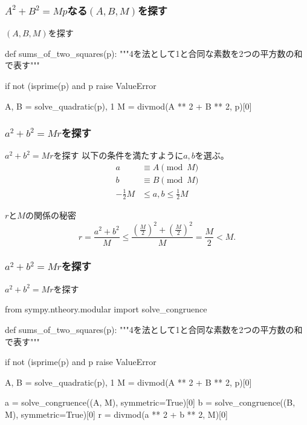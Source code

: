 \documentclass[dvipdfmx,11pt,notheorems]{beamer}
\theoremstyle{definition}
\begin{document}
\begin{frame}[fragile]\frametitle{$A^{2}+B^{2} = Mp$なる$(A, B, M)$を探す}

\begin{block}{$(A, B, M)$を探す}
\begin{pyverbatim}
def sums_of_two_squares(p):
    """4を法として1と合同な素数を2つの平方数の和で表す"""

    if not (isprime(p) and p %
        raise ValueError
            
    A, B = solve_quadratic(p), 1
    M = divmod(A ** 2 + B ** 2, p)[0]
\end{pyverbatim}
\end{block}

\end{frame}

\begin{frame}[fragile]\frametitle{$a^{2}+b^{2}=Mr$を探す}

\begin{block}{$a^{2}+b^{2}=Mr$を探す}
以下の条件を満たすように$a, b$を選ぶ。
\begin{align*} 
a &\equiv A \pmod{M} \\ 
b &\equiv B \pmod{M} \\ 
-\frac{1}{2}M &\leq a, b \leq \frac{1}{2}M
\end{align*}
\end{block}

\begin{exampleblock}{$r$と$M$の関係の秘密}
\begin{equation*}
r = \frac{a^{2} + b^{2}}{M} \leq \frac{\left (\frac{M}{2} \right)^{2} + \left (\frac{M}{2} \right)^{2}}{M} = \frac{M}{2} < M.
\end{equation*}
\end{exampleblock}

\end{frame}

\begin{frame}[fragile]\frametitle{$a^{2}+b^{2}=Mr$を探す}

\begin{block}{$a^{2}+b^{2}=Mr$を探す}
\begin{pyverbatim}
from sympy.ntheory.modular import solve_congruence


def sums_of_two_squares(p):
    """4を法として1と合同な素数を2つの平方数の和で表す"""

    if not (isprime(p) and p %
        raise ValueError
                    
    A, B = solve_quadratic(p), 1
    M = divmod(A ** 2 + B ** 2, p)[0]

    a = solve_congruence((A, M), symmetric=True)[0]
    b = solve_congruence((B, M), symmetric=True)[0]
    r = divmod(a ** 2 + b ** 2, M)[0]
\end{pyverbatim}
\end{block}

\end{frame}
\end{document}
